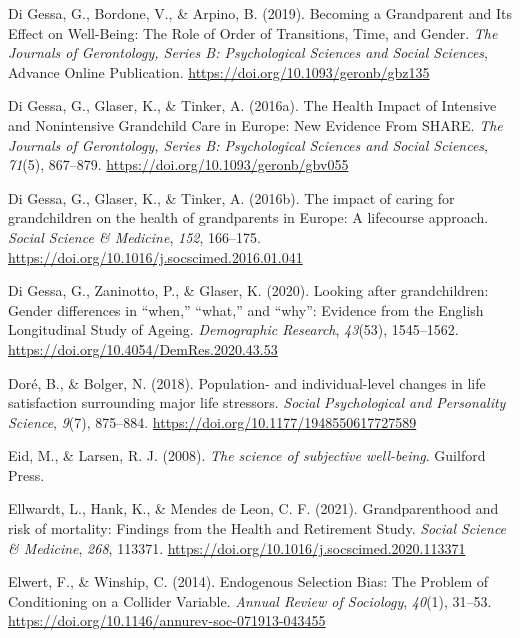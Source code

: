 \documentclass[
  english,
  man, noextraspace,floatsintext]{apa7}
\begin{document}
\leavevmode\hypertarget{ref-digessaBecomingGrandparentIts2019}{}%
Di Gessa, G., Bordone, V., \& Arpino, B. (2019). Becoming a Grandparent and Its Effect on Well-Being: The Role of Order of Transitions, Time, and Gender. \emph{The Journals of Gerontology, Series B: Psychological Sciences and Social Sciences}, Advance Online Publication. \url{https://doi.org/10.1093/geronb/gbz135}

\leavevmode\hypertarget{ref-digessaHealthImpactIntensive2016}{}%
Di Gessa, G., Glaser, K., \& Tinker, A. (2016a). The Health Impact of Intensive and Nonintensive Grandchild Care in Europe: New Evidence From SHARE. \emph{The Journals of Gerontology, Series B: Psychological Sciences and Social Sciences}, \emph{71}(5), 867--879. \url{https://doi.org/10.1093/geronb/gbv055}

\leavevmode\hypertarget{ref-digessaImpactCaringGrandchildren2016}{}%
Di Gessa, G., Glaser, K., \& Tinker, A. (2016b). The impact of caring for grandchildren on the health of grandparents in Europe: A lifecourse approach. \emph{Social Science \& Medicine}, \emph{152}, 166--175. \url{https://doi.org/10.1016/j.socscimed.2016.01.041}

\leavevmode\hypertarget{ref-digessaLookingGrandchildrenGender2020}{}%
Di Gessa, G., Zaninotto, P., \& Glaser, K. (2020). Looking after grandchildren: Gender differences in ``when,'' ``what,'' and ``why'': Evidence from the English Longitudinal Study of Ageing. \emph{Demographic Research}, \emph{43}(53), 1545--1562. \url{https://doi.org/10.4054/DemRes.2020.43.53}

\leavevmode\hypertarget{ref-dorePopulationIndividuallevelChanges2018}{}%
Doré, B., \& Bolger, N. (2018). Population- and individual-level changes in life satisfaction surrounding major life stressors. \emph{Social Psychological and Personality Science}, \emph{9}(7), 875--884. \url{https://doi.org/10.1177/1948550617727589}

\leavevmode\hypertarget{ref-eidScienceSubjectiveWellbeing2008}{}%
Eid, M., \& Larsen, R. J. (2008). \emph{The science of subjective well-being}. Guilford Press.

\leavevmode\hypertarget{ref-ellwardtGrandparenthoodRiskMortality2021}{}%
Ellwardt, L., Hank, K., \& Mendes de Leon, C. F. (2021). Grandparenthood and risk of mortality: Findings from the Health and Retirement Study. \emph{Social Science \& Medicine}, \emph{268}, 113371. \url{https://doi.org/10.1016/j.socscimed.2020.113371}

\leavevmode\hypertarget{ref-elwertEndogenousSelectionBias2014}{}%
Elwert, F., \& Winship, C. (2014). Endogenous Selection Bias: The Problem of Conditioning on a Collider Variable. \emph{Annual Review of Sociology}, \emph{40}(1), 31--53. \url{https://doi.org/10.1146/annurev-soc-071913-043455}
\end{document}
